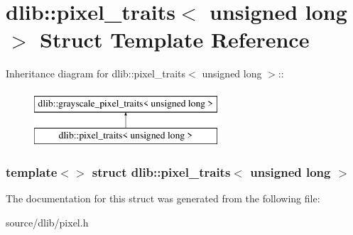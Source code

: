 \hypertarget{structdlib_1_1pixel__traits_3_01unsigned_01long_01_4}{
\section{dlib::pixel\_\-traits$<$ unsigned long $>$ Struct Template Reference}
\label{structdlib_1_1pixel__traits_3_01unsigned_01long_01_4}
}
Inheritance diagram for dlib::pixel\_\-traits$<$ unsigned long $>$::\begin{figure}[H]
\begin{center}
\leavevmode
\includegraphics[height=2cm]{structdlib_1_1pixel__traits_3_01unsigned_01long_01_4}
\end{center}
\end{figure}
\subsubsection*{template$<$$>$ struct dlib::pixel\_\-traits$<$ unsigned long $>$}



The documentation for this struct was generated from the following file:\begin{DoxyCompactItemize}
\item 
source/dlib/pixel.h\end{DoxyCompactItemize}
